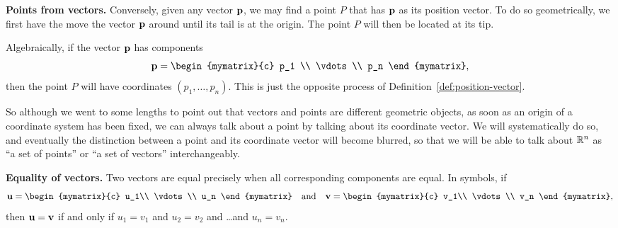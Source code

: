 \noindent\textbf{Points from vectors.} Conversely, given any vector
$\mbox{\bf p}$, we may find a point $P$ that has $\mbox{\bf p}$ as its
position vector. To do so geometrically, we first have the move the
vector $\mbox{\bf p}$ around until its tail is at the origin. The point
$P$ will then be located at its tip.
\begin{center}
\end{center}
Algebraically, if the vector $\mbox{\bf p}$ has components
\begin{equation*}
  \vect{p} =
  \begin{mymatrix}{c}
    p_1    \\
    \vdots \\
    p_n
  \end{mymatrix},
\end{equation*}
then the point $P$ will have coordinates $(p_1,\ldots,p_n)$. This is
just the opposite process of Definition~\ref{def:position-vector}.

So although we went to some lengths to point out that vectors and
points are different geometric objects, as soon as an origin of a
coordinate system has been fixed, we can always talk about a point by
talking about its coordinate vector. We will systematically do so, and
eventually the distinction between a point and its coordinate vector
will become blurred, so that we will be able to talk about $\mathbb{R}^n$ as
``a set of points'' or ``a set of vectors'' interchangeably.  \bigskip

\noindent\textbf{Equality of vectors.}
Two vectors are equal precisely when all corresponding components are
equal. In symbols, if
\begin{equation*}
  \vect{u} =
  \begin{mymatrix}{c}
    u_1\\
    \vdots\\
    u_n
  \end{mymatrix}
  \quad\mbox{and}\quad
  \vect{v} =
  \begin{mymatrix}{c}
    v_1\\
    \vdots\\
    v_n
  \end{mymatrix},
\end{equation*}
then $\mbox{\bf u}=\mbox{\bf v}$ if and only if $u_1=v_1$ and $u_2=v_2$ and
\ldots and $u_n=v_n$.
\bigskip

